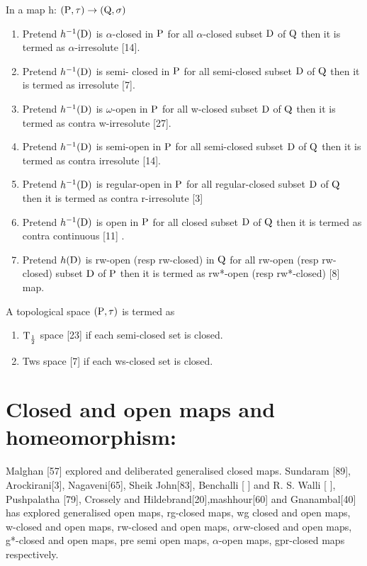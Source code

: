 \begin{dfn}\label{dfn1.3.2} 
In a map h: $(\mathrm{P}, \tau) \rightarrow (\mathrm{Q}, \sigma)$
\begin{enumerate}
\item Pretend $h^{-1}(\mathrm{D})$ is $\alpha$-closed in $\mathrm{P}$ for all $\alpha$-closed subset $\mathrm{D}$ of $\mathrm{Q}$ then it is termed as $\alpha$-irresolute [14]. 
\item Pretend $h^{-1}(\mathrm{D})$ is semi- closed in $\mathrm{P}$ for all semi-closed subset $\mathrm{D}$ of $\mathrm{Q}$ then it is termed as irresolute [7].
\item Pretend $h^{-1}(\mathrm{D})$ is $\omega$-open in $\mathrm{P}$ for all w-closed subset $\mathrm{D}$ of $\mathrm{Q}$ then it is termed as contra w-irresolute [27]. 
\item Pretend $h^{-1}(\mathrm{D})$ is semi-open in $\mathrm{P}$ for all semi-closed subset $\mathrm{D}$ of $\mathrm{Q}$ then it is termed as contra irresolute [14]. 
\item Pretend $h^{-1}(\mathrm{D})$ is regular-open in $\mathrm{P}$ for all regular-closed subset $\mathrm{D}$ of $\mathrm{Q}$ then it is termed as contra r-irresolute [3]  
\item Pretend $h^{-1}(\mathrm{D})$ is open in $\mathrm{P}$ for all closed subset $\mathrm{D}$ of $\mathrm{Q}$ then it is termed as contra continuous [11] . 
\item Pretend $h(\mathrm{D})$ is rw-open (resp rw-closed) in $\mathrm{Q}$ for all rw-open (resp rw-closed) subset $\mathrm{D}$ of $\mathrm{P}$ then it is termed as rw*-open  (resp rw*-closed) [8] map. 
\end{enumerate}
\end{dfn}


\begin{dfn}\label{dfn1.3.3}  
A topological space $(\mathrm{P}, \tau)$ is termed as 
\begin{enumerate}[\rm i)]
\item ${\rm T}_{\frac{1}{2}}$ space [23] if each semi-closed set is closed.  
\item Tws space [7] if each ws-closed set is closed. 
\end{enumerate}
\end{dfn}

\section{Closed and open maps and homeomorphism:}

Malghan [57] explored and deliberated generalised closed maps. Sundaram [89], Arockirani[3], Nagaveni[65], Sheik John[83], Benchalli [ ] and  R. S. Walli [  ], Pushpalatha [79], Crossely and Hildebrand[20],mashhour[60] and Gnanambal[40] has explored generalised open maps, rg-closed  maps, wg closed and open maps, w-closed and open maps, rw-closed and open maps, $\alpha$rw-closed and open maps, g*-closed and open maps, pre semi open maps, $\alpha$-open maps, gpr-closed maps respectively.


